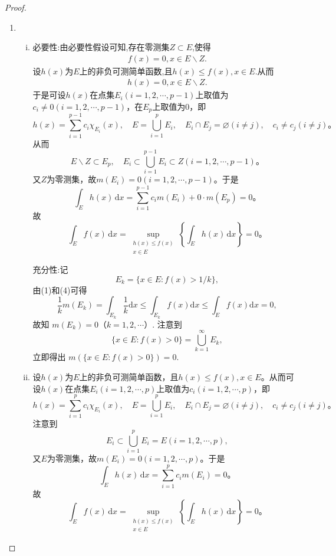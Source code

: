 \documentclass[../../main.tex]{subfiles}
\begin{document}
\begin{proof}
\begin{enumerate}[(1)]
\item \begin{enumerate}[(i)]
\item {\heiti 必要性:}由必要性假设可知,存在零测集$Z\subset E$,使得
\begin{align*}
f(x)=0,x\in E\backslash Z.
\end{align*}
设$h(x)$为$E$上的非负可测简单函数,且$h(x)\leqslant f(x),x\in E$.从而
\begin{align*}
h(x)=0,x\in E\backslash Z.
\end{align*}
于是可设$h(x)$在点集$E_i (i = 1,2,\cdots,p-1)$上取值为$c_i\ne 0 (i = 1,2,\cdots,p-1)$，在$E_p$上取值为$0$，即
\[
h(x) = \sum_{i=1}^{p-1} c_i \chi_{E_i}(x),\quad E = \bigcup_{i=1}^p E_i,\quad E_i \cap E_j = \varnothing (i \ne j),\quad c_i \ne c_j (i \ne j)。
\]
从而
\[
E\backslash Z \subset E_p,\quad E_i \subset \bigcup_{i=1}^{p-1} E_i \subset Z (i = 1,2,\cdots,p-1)。
\]
又$Z$为零测集，故$m(E_i) = 0 (i = 1,2,\cdots,p-1)$。于是
\[
\int_E h(x)\,\mathrm{d}x = \sum_{i=1}^{p-1} c_i m(E_i) + 0 \cdot m(E_p) = 0。
\]
故
\[
\int_E f(x)\,\mathrm{d}x = \sup_{\substack{h(x) \leqslant f(x) \\ x \in E}} \left\{ \int_E h(x)\,\mathrm{d}x \right\} = 0。
\]

{\heiti 充分性:}记
\[E_k=\{x\in E:f(x)>1/k\},\]
由(1)和(4)可得
\[\frac{1}{k}m(E_k)=\int_{E_k}\frac{1}{k}\mathrm{d}x\leq\int_{E_k}f(x)\mathrm{d}x\leq\int_{E}f(x)\mathrm{d}x = 0,\]
故知 \(m(E_k)=0\)（\(k = 1,2,\cdots\)）. 注意到
\[\{x\in E:f(x)>0\}=\bigcup_{k = 1}^{\infty}E_k,\]
立即得出 \(m(\{x\in E:f(x)>0\}) = 0\).

\item 设$h(x)$为$E$上的非负可测简单函数，且$h(x) \leqslant f(x), x\in E$。从而可设$h(x)$在点集$E_i (i = 1,2,\cdots,p)$上取值为$c_i (i = 1,2,\cdots,p)$，即
\[
h(x) = \sum_{i=1}^p c_i \chi_{E_i}(x),\quad E = \bigcup_{i=1}^p E_i,\quad E_i \cap E_j = \varnothing (i \ne j),\quad c_i \ne c_j (i \ne j)。
\]
注意到
\[
E_i \subset \bigcup_{i=1}^p E_i = E (i = 1,2,\cdots,p),
\]
又$E$为零测集，故$m(E_i) = 0 (i = 1,2,\cdots,p)$。于是
\[
\int_E h(x)\,\mathrm{d}x = \sum_{i=1}^p c_i m(E_i) = 0。
\]
故
\[
\int_E f(x)\,\mathrm{d}x = \sup_{\substack{h(x) \leqslant f(x) \\ x \in E}} \left\{ \int_E h(x)\,\mathrm{d}x \right\} = 0。
\]
\end{enumerate}
\end{enumerate} 
\end{proof}
\end{document}
